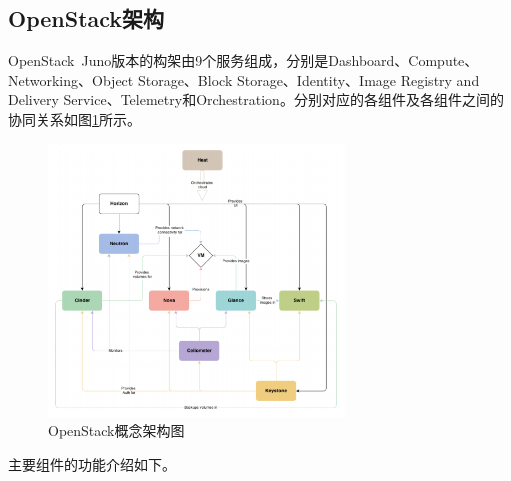 \subsection{OpenStack架构}
OpenStack\ Juno版本的构架由9个服务组成，分别是Dashboard、Compute、Networking、Object Storage、Block Storage、Identity、Image Registry and Delivery Service、Telemetry和Orchestration。分别对应的各组件及各组件之间的协同关系如图\ref{fig:openstack}所示。

\begin{figure}[!htb]
  \centering
  \includegraphics[width=0.7\textwidth]{logo/openstack.png}
  \caption{OpenStack概念架构图}
  \label{fig:openstack}
\end{figure}

主要组件的功能介绍如下\cite{OpenStack-3}。

